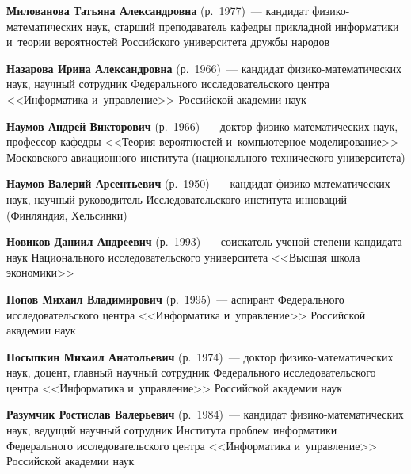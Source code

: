 \begin{multicols}{2}
 
\noindent
\textbf{Милованова Татьяна Александровна} (р.\ 1977)~---
кандидат фи\-зи\-ко-ма\-те\-ма\-ти\-че\-ских наук, старший преподаватель
кафедры прикладной информатики и~тео\-рии вероятностей
Российского университета дружбы народов

 
\noindent
\textbf{Назарова Ирина Александровна} (р.\ 1966)~--- 
кандидат фи\-зи\-ко-ма\-те\-ма\-ти\-че\-ских наук, научный сотрудник 
Федерального исследовательского центра <<Информатика и~управ\-ле\-ние>>
Российской академии наук

 
 \noindent
\textbf{Наумов Андрей Викторович} (р.\ 1966)~--- 
доктор физико-математических наук, профессор кафедры 
<<Тео\-рия вероятностей и~компьютерное моделирование>>
Московского авиационного института (национального технического университета)


 
 \noindent
\textbf{Наумов Валерий Арсентьевич} (р.\ 1950)~--- 
кандидат фи\-зи\-ко-ма\-те\-ма\-ти\-че\-ских наук, научный руководитель 
Исследовательского института инноваций (Финляндия, Хельсинки)


 
 \noindent
\textbf{Новиков Даниил Андреевич} (р.\ 1993)~--- 
соискатель ученой степени кандидата наук Национального исследовательского
 университета <<Высшая школа экономики>>

 
 \noindent
\textbf{Попов Михаил Владимирович} (р.\ 1995)~--- 
аспирант Федерального исследовательского центра <<Информатика и~управ\-ле\-ние>>
Российской академии наук 

\def\leftkol{ОБ АВТОРАХ}
\def\rightkol{ОБ АВТОРАХ}

 \noindent
\textbf{Посыпкин Михаил Анатольевич} (р.\ 1974)~--- 
доктор фи\-зи\-ко-ма\-те\-ма\-ти\-че\-ских наук, доцент, 
главный научный сотрудник Федерального исследовательского центра 
<<Информатика и~управ\-ле\-ние>> Российской академии наук 

 
 \noindent
\textbf{Разумчик Ростислав Валерьевич} (р.\ 1984)~--- 
кандидат фи\-зи\-ко-ма\-те\-ма\-ти\-че\-ских наук, 
ведущий научный сотрудник Института проб\-лем информатики 
Федерального исследовательского центра <<Информатика и~управ\-ле\-ние>> 
Российской академии наук


\end{multicols}
